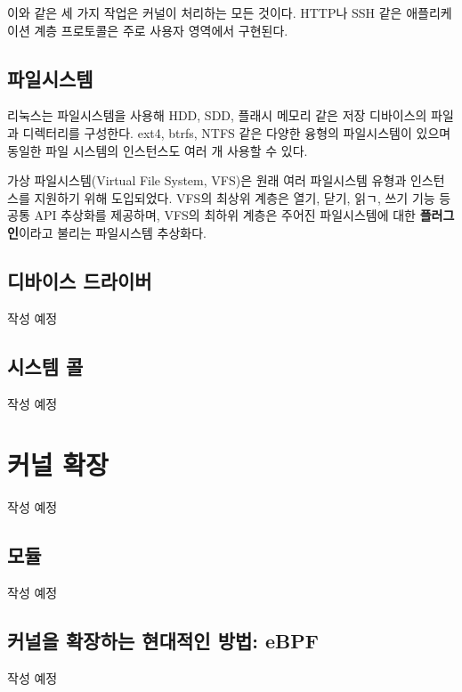 \begin{flushleft}
    이와 같은 세 가지 작업은 커널이 처리하는 모든 것이다.
    HTTP나 SSH 같은 애플리케이션 계층 프로토콜은 주로 사용자 영역에서 구현된다.
\end{flushleft}

\subsection{파일시스템}
\begin{flushleft}
    리눅스는 파일시스템을 사용해 HDD, SDD, 플래시 메모리 같은 
    저장 디바이스의 파일과 디렉터리를 구성한다. 
    ext4, btrfs, NTFS 같은 다양한 융형의 파일시스템이 있으며 
    동일한 파일 시스템의 인스턴스도 여러 개 사용할 수 있다.
\end{flushleft}
\begin{flushleft}
    가상 파일시스템(Virtual File System, VFS)은 원래 여러 파일시스템 유형과 인스턴스를 지원하기 위해 도입되었다.
    VFS의 최상위 계층은 열기, 닫기, 읽ㄱ, 쓰기 기능 등 공통 API 추상화를 제공하며, 
    VFS의 최하위 계층은 주어진 파일시스템에 대한 \textbf{플러그인}이라고 불리는 파일시스템 추상화다.
\end{flushleft}

\subsection{디바이스 드라이버}
작성 예정

\subsection{시스템 콜}
작성 예정

\section{커널 확장}
작성 예정

\subsection{모듈}
작성 예정

\subsection{커널을 확장하는 현대적인 방법: eBPF}
작성 예정